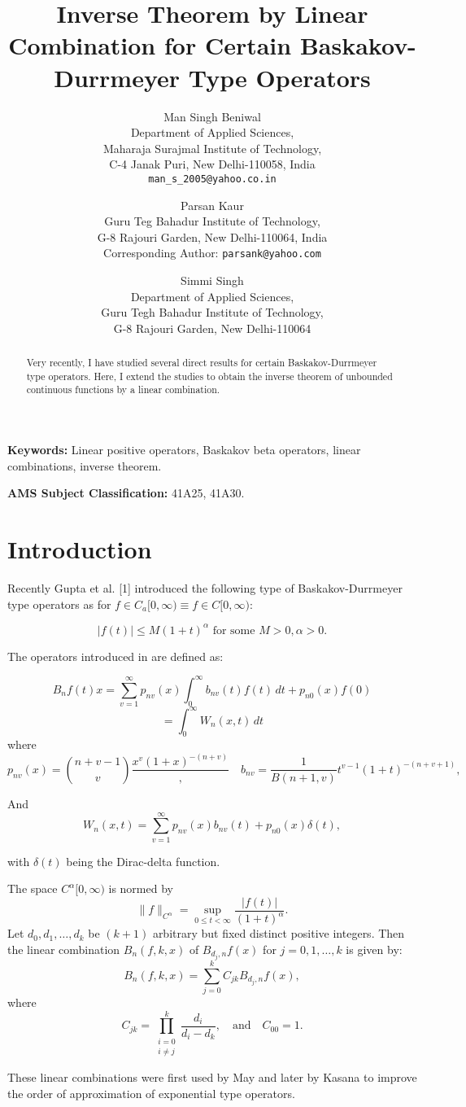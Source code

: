 \documentclass[12pt]{article}
\title{Inverse Theorem by Linear Combination for Certain Baskakov-Durrmeyer Type Operators}
\author{
    Man Singh Beniwal \\
    Department of Applied Sciences, \\
    Maharaja Surajmal Institute of Technology, \\
    C-4 Janak Puri, New Delhi-110058, India \\
    \texttt{man\_s\_2005@yahoo.co.in}
    \and
    Parsan Kaur \\
    Guru Teg Bahadur Institute of Technology, \\
    G-8 Rajouri Garden, New Delhi-110064, India \\
    Corresponding Author: \texttt{parsank@yahoo.com}
    \and
    Simmi Singh \\
    Department of Applied Sciences, \\
    Guru Tegh Bahadur Institute of Technology, \\
    G-8 Rajouri Garden, New Delhi-110064
}
\begin{document}
\date{}
\maketitle


\begin{abstract}
Very recently, I have studied several direct results for certain Baskakov-Durrmeyer type operators. Here, I extend the studies to obtain the inverse theorem of unbounded continuous functions by a linear combination.
\end{abstract}

\textbf{Keywords:} Linear positive operators, Baskakov beta operators, linear combinations, inverse theorem.

\textbf{AMS Subject Classification:} 41A25, 41A30.

\section{Introduction}

Recently Gupta et al. [1] introduced the following type of Baskakov-Durrmeyer type operators as
for $f \in C_a[0,\infty)\equiv f \in C[0, \infty ):$ 

\[
|f(t)| \leq M(1+t)^\alpha \text{ for some } M > 0, \alpha > 0.
\]

The operators introduced in \cite{gupta2006} are defined as:

\[
    B_n f(t) x = \sum_{v=1}^{\infty} p_{nv}(x) \int_{0}^{\infty} b_{nv}(t) f(t) \, dt + p_{n0}(x) f(0)
\]
\[
    = \int_{0}^{\infty} W_{n}(x,t) \, dt
\]
where
\[
    p_{nv}(x) = \binom{n+v-1}{v} \frac{x^v (1+x)^{-(n+v)}}, \quad b_{nv} = \frac{1}{B(n+1, v)} t^{v-1} (1+t)^{-(n+v+1)},
\]

And \[W_n(x, t) = \sum_{v=1}^{\infty} p_{nv}(x) b_{nv}(t) + p_{n0}(x) \delta(t),\]

with $\delta(t)$ being the Dirac-delta function.

The space $C^{\alpha}[0, \infty)$ is normed by 
\[
    \|f\|_{C^{\alpha}} = \sup_{0 \leq t < \infty} \frac{|f(t)|}{(1+t)^{\alpha}}.
\]
Let $d_0, d_1, \ldots, d_k$ be $(k+1)$ arbitrary but fixed distinct positive integers. Then the linear combination $B_n(f, k, x)$ of $B_{d_j, n} f(x)$ for $j=0, 1, \ldots, k$ is given by:
\[
    B_n(f, k, x) = \sum_{j=0}^{k} C_{jk} B_{d_j, n} f(x),
\]
where 
\[
    C_{jk} = \prod_{\substack{i=0 \\ i \neq j}}^{k} \frac{d_i}{d_i - d_k}, \quad \text{and} \quad C_{00} = 1.
\]

These linear combinations were first used by May \cite{may1976} and later by Kasana \cite{kasana1988} to improve the order of approximation of exponential type operators.
\end{document}
